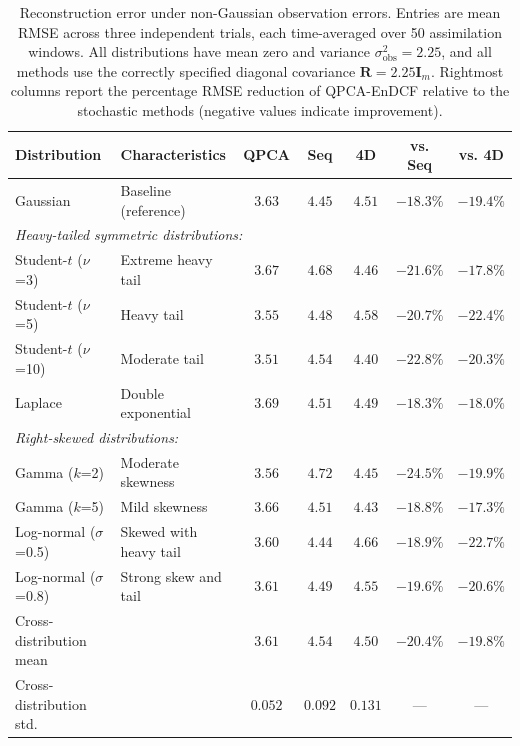 \documentclass[11pt,a4paper]{article}
\begin{document}
\begin{table}[htbp]
\centering
\caption{Reconstruction error under non-Gaussian observation errors. Entries are mean RMSE across three independent trials, each time-averaged over 50 assimilation windows. All distributions have mean zero and variance $\sigma_{\mathrm{obs}}^2=2.25$, and all methods use the correctly specified diagonal covariance $\mathbf{R}=2.25\mathbf{I}_m$. Rightmost columns report the percentage RMSE reduction of QPCA-EnDCF relative to the stochastic methods (negative values indicate improvement).}
\label{tab:nongaussian_performance}
\small
\begin{tabular}{llccccc}
\toprule
\textbf{Distribution} & \textbf{Characteristics} & \textbf{QPCA} & \textbf{Seq} & \textbf{4D} & \textbf{vs. Seq} & \textbf{vs. 4D} \\
\midrule
Gaussian          & Baseline (reference)      & $\mathbf{3.63}$ & $4.45$ & $4.51$ & $-18.3\%$ & $-19.4\%$ \\
\midrule
\multicolumn{7}{l}{\textit{Heavy-tailed symmetric distributions:}} \\
Student-$t$ ($\nu$=3)  & Extreme heavy tail & $\mathbf{3.67}$ & $4.68$ & $4.46$ & $-21.6\%$ & $-17.8\%$ \\
Student-$t$ ($\nu$=5)  & Heavy tail         & $\mathbf{3.55}$ & $4.48$ & $4.58$ & $-20.7\%$ & $-22.4\%$ \\
Student-$t$ ($\nu$=10) & Moderate tail      & $\mathbf{3.51}$ & $4.54$ & $4.40$ & $-22.8\%$ & $-20.3\%$ \\
Laplace           & Double exponential & $\mathbf{3.69}$ & $4.51$ & $4.49$ & $-18.3\%$ & $-18.0\%$ \\
\midrule
\multicolumn{7}{l}{\textit{Right-skewed distributions:}} \\
Gamma ($k$=2)     & Moderate skewness  & $\mathbf{3.56}$ & $4.72$ & $4.45$ & $-24.5\%$ & $-19.9\%$ \\
Gamma ($k$=5)     & Mild skewness      & $\mathbf{3.66}$ & $4.51$ & $4.43$ & $-18.8\%$ & $-17.3\%$ \\
Log-normal ($\sigma$=0.5) & Skewed with heavy tail & $\mathbf{3.60}$ & $4.44$ & $4.66$ & $-18.9\%$ & $-22.7\%$ \\
Log-normal ($\sigma$=0.8) & Strong skew and tail  & $\mathbf{3.61}$ & $4.49$ & $4.55$ & $-19.6\%$ & $-20.6\%$ \\
\midrule
Cross-distribution mean & & $\mathbf{3.61}$ & $4.54$ & $4.50$ & $-20.4\%$ & $-19.8\%$ \\
Cross-distribution std. & & $\mathbf{0.052}$ & $0.092$ & $0.131$ & --- & --- \\
\bottomrule
\end{tabular}
\end{table}
\end{document}
